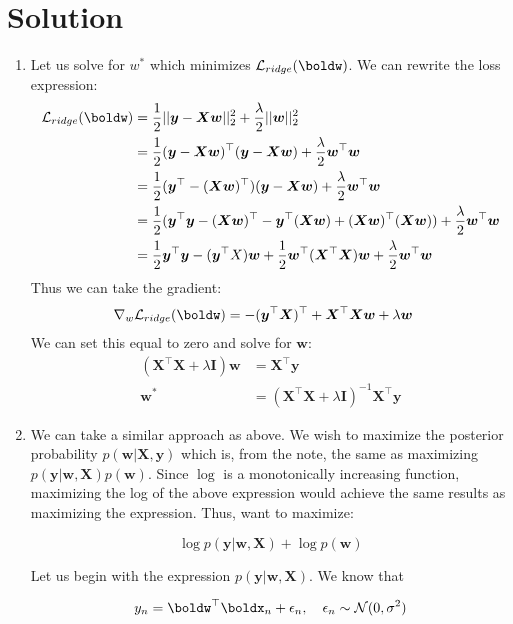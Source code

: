 \documentclass[submit]{../harvardml}
\newenvironment{solution}
  {\color{blue}\section*{Solution}}
{}
\begin{document}
\begin{solution}
\begin{enumerate}
        \item Let us solve for $w^*$ which minimizes $\mathcal{L}_{ridge}(\boldw)$. We can rewrite the loss expression:
        \begin{align*}
            \mathcal{L}_{ridge}(\boldw) &= \frac{1}{2} || \bm y - \bm X \bm w ||^2_2 + \frac{\lambda}{2} || \bm w ||^2_2 \\
            &= \frac{1}{2}(\bm y - \bm X \bm w)^\top (\bm y - \bm X \bm w) + \frac{\lambda}{2} \bm w^\top \bm w \\
            &= \frac{1}{2}(\bm y^\top - (\bm X\bm w)^\top)(\bm y-\bm X\bm w) + \frac{\lambda}{2} \bm w^\top \bm w \\
            &= \frac{1}{2}(\bm y^\top \bm y - (\bm X\bm w)^\top -\bm y^\top (\bm X\bm w) + (\bm X\bm w)^\top (\bm X\bm w)) + \frac{\lambda}{2}\bm w^\top \bm w \\
            &= \frac{1}{2} \bm y^\top \bm y - (\bm y^\top X)\bm w + \frac{1}{2} \bm w^\top (\bm X^\top \bm X)\bm w + \frac{\lambda}{2}\bm w^\top \bm w 
        \end{align*}
        Thus we can take the gradient:
        \begin{align*}
            \nabla_w \mathcal{L}_{ridge}(\boldw) &= -(\bm y^\top \bm X)^\top + \bm X^\top \bm X\bm w + \lambda \bm w
        \end{align*}
        We can set this equal to zero and solve for $\bm w$:
        \begin{align*}
            (\bm X^\top \bm X + \lambda\bm I)\bm w &= \bm X^\top \bm y \\
            \bm w^* &= (\bm X^\top \bm X + \lambda\bm I)^{-1}\bm X^\top \bm y
        \end{align*}

        \item We can take a similar approach as above. We wish to maximize the posterior probability $p(\bm w | \bm X, \bm y)$ which is, from the note, the same as maximizing $p(\bm y|\bm w, \bm X)p(\bm w)$. Since $\log$ is a monotonically increasing function, maximizing the log of the above expression would achieve the same results as maximizing the expression. Thus, want to maximize:

        \[
        \log p(\bm y|\bm w, \bm X) + \log p(\bm w)
        \]

        Let us begin with the expression $p(\bm y|\bm w, \bm X)$. We know that 

        \[y_n = \boldw^\top\boldx_n + \epsilon_n, \quad \epsilon_n \sim \mathcal{N}(0, \sigma^2)\]


\end{enumerate}
\end{solution}
\end{document}
